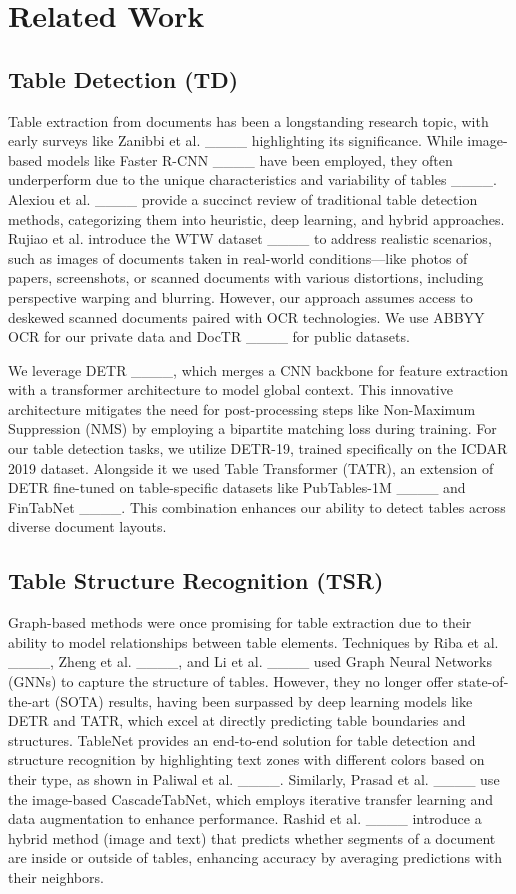 \section{Related Work}
\label{sec:related-work}

\subsection{Table Detection (TD)}

Table extraction from documents has been a longstanding research topic, with early surveys like Zanibbi et al. ____ highlighting its significance. While image-based models like Faster R-CNN ____ have been employed, they often underperform due to the unique characteristics and variability of tables ____. Alexiou et al. ____ provide a succinct review of traditional table detection methods, categorizing them into heuristic, deep learning, and hybrid approaches. Rujiao et al. introduce the WTW dataset ____ to address realistic scenarios, such as images of documents taken in real-world conditions—like photos of papers, screenshots, or scanned documents with various distortions, including perspective warping and blurring. However, our approach assumes access to deskewed scanned documents paired with OCR technologies. We use ABBYY OCR for our private data and DocTR ____ for public datasets.

We leverage DETR ____, which merges a CNN backbone for feature extraction with a transformer architecture to model global context. This innovative architecture mitigates the need for post-processing steps like Non-Maximum Suppression (NMS) by employing a bipartite matching loss during training. For our table detection tasks, we utilize DETR-19, trained specifically on the ICDAR 2019 dataset. Alongside it we used Table Transformer (TATR), an extension of DETR fine-tuned on table-specific datasets like PubTables-1M ____ and FinTabNet ____. This combination enhances our ability to detect tables across diverse document layouts.

\subsection{Table Structure Recognition (TSR)}

Graph-based methods were once promising for table extraction due to their ability to model relationships between table elements. Techniques by Riba et al. ____, Zheng et al. ____, and Li et al. ____ used Graph Neural Networks (GNNs) to capture the structure of tables. However, they no longer offer state-of-the-art (SOTA) results, having been surpassed by deep learning models like DETR and TATR, which excel at directly predicting table boundaries and structures. TableNet provides an end-to-end solution for table detection and structure recognition by highlighting text zones with different colors based on their type, as shown in Paliwal et al. ____. Similarly, Prasad et al. ____ use the image-based CascadeTabNet, which employs iterative transfer learning and data augmentation to enhance performance. Rashid et al. ____ introduce a hybrid method (image and text) that predicts whether segments of a document are inside or outside of tables, enhancing accuracy by averaging predictions with their neighbors.

